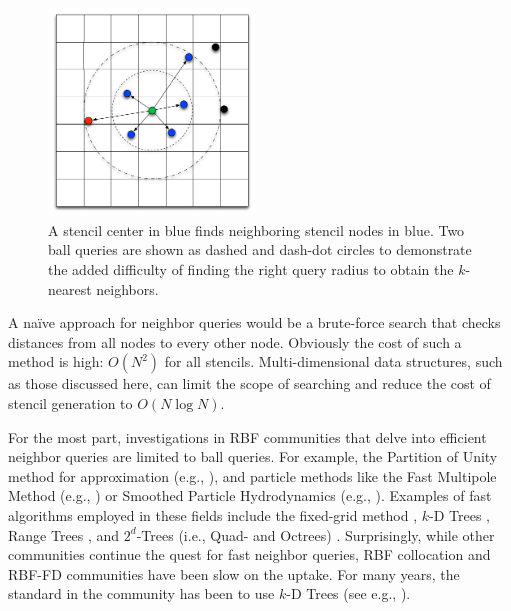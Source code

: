\documentclass{report}
\begin{document}
\begin{figure}
\centering
\includegraphics[width=5.5cm]{rbffd_methods_content/neighbors/ball_query_vs_kNN.png}
\caption{A stencil center in blue finds neighboring stencil nodes in blue. Two ball queries are shown as dashed and dash-dot circles to demonstrate the added difficulty of finding the right query radius to obtain the $k$-nearest neighbors.}
\label{fig:nearest_neighbor_example}
\end{figure}


A na\"{i}ve approach for neighbor queries would be a brute-force search that checks distances from all nodes to every other node. Obviously the cost of such a method is high: $O(N^2)$ for all stencils. Multi-dimensional data structures, such as those discussed here, can limit the scope of searching and reduce the cost of stencil generation to $O(N \log{N})$. 

For the most part, investigations in RBF communities that delve into efficient neighbor queries are limited to ball queries. For example, the Partition of Unity method for approximation (e.g., \cite{Wendland2002,WendlandBook}), and particle methods like the Fast Multipole Method (e.g., \cite{Ying2006, Gumerov2003}) or Smoothed Particle Hydrodynamics (e.g., \cite{Krog2010}). Examples of fast algorithms employed in these fields include the fixed-grid method \cite{WendlandBook,Krog2010}, $k$-D Trees \cite{WendlandBook}, Range Trees \cite{Wendland2002,WendlandBook}, and $2^d$-Trees (i.e., Quad- and Octrees) \cite{Gumerov2003, Ying2006}. Surprisingly, while other communities continue the quest for fast neighbor queries, RBF collocation and RBF-FD communities have been slow on the uptake. For many years, the standard in the community has been to use $k$-D Trees (see e.g., \cite{Fasshauer2007, FlyerLehto11,FornbergLehto11}). 
\end{document}
